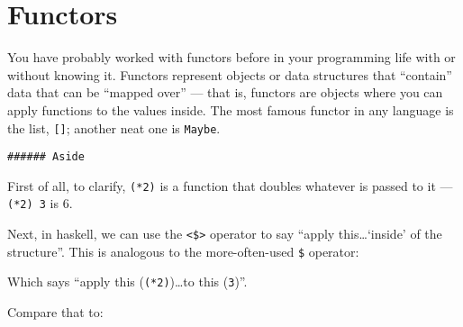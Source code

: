 \documentclass[]{article}
\newenvironment{Shaded}{}{}
\newcommand{\DataTypeTok}[1]{\textcolor[rgb]{0.56,0.13,0.00}{{#1}}}
\newcommand{\DecValTok}[1]{\textcolor[rgb]{0.25,0.63,0.44}{{#1}}}
\newcommand{\FunctionTok}[1]{\textcolor[rgb]{0.02,0.16,0.49}{{#1}}}
\newcommand{\NormalTok}[1]{{#1}}
\begin{document}
\section{Functors}\label{functors}

You have probably worked with functors before in your programming life with or without knowing it.
Functors represent objects or data structures that ``contain'' data that can be ``mapped over'' ---
that is, functors are objects where you can apply functions to the values inside. The most famous
functor in any language is the list, \texttt{{[}{]}}; another neat one is \texttt{Maybe}.

\begin{Shaded}
\end{Shaded}

\begin{verbatim}
###### Aside
\end{verbatim}

First of all, to clarify, \texttt{(*2)} is a function that doubles whatever is passed to it ---
\texttt{(*2)\ 3} is 6.

Next, in haskell, we can use the \texttt{\textless{}\$\textgreater{}} operator to say ``apply
this\ldots{}`inside' of the structure''. This is analogous to the more-often-used \texttt{\$}
operator:

\begin{Shaded}
\end{Shaded}

Which says ``apply this (\texttt{(*2)})\ldots{}to this (\texttt{3})''.

Compare that to:

\begin{Shaded}
\end{Shaded}
\end{document}
